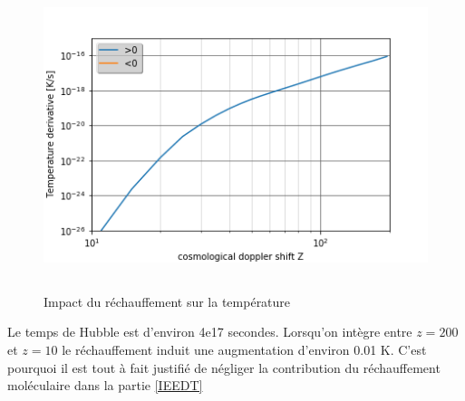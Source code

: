 \documentclass[10pt, a4paper]{report}
\numberwithin{equation}{subsection}
\begin{document}
\begin{figure}[]
\centering
\includegraphics[width=14.0cm,height=9cm]{dTcoolfinal.png}
\caption{Impact du réchauffement sur la température}
\label{fig:dTCOOL1}
\end{figure}
Le temps de Hubble est d'environ 4e17 secondes. Lorsqu'on intègre entre $z=200$ et $z=10$ le réchauffement induit une augmentation d'environ 0.01 K. C'est pourquoi il est tout à fait justifié de négliger la contribution du réchauffement moléculaire dans la partie \ref{IEEDT}


\end{document}
